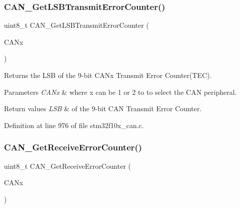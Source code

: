 \subsubsection{\texorpdfstring{C\+A\+N\+\_\+\+Get\+L\+S\+B\+Transmit\+Error\+Counter()}{CAN\_GetLSBTransmitErrorCounter()}}
{\footnotesize\ttfamily uint8\+\_\+t C\+A\+N\+\_\+\+Get\+L\+S\+B\+Transmit\+Error\+Counter (\begin{DoxyParamCaption}\item[{\hyperlink{struct_c_a_n___type_def}{C\+A\+N\+\_\+\+Type\+Def} $\ast$}]{C\+A\+Nx }\end{DoxyParamCaption})}



Returns the L\+SB of the 9-\/bit C\+A\+Nx Transmit Error Counter(\+T\+E\+C). 


\begin{DoxyParams}{Parameters}
{\em C\+A\+Nx} & where x can be 1 or 2 to to select the C\+AN peripheral. \\
\hline
\end{DoxyParams}

\begin{DoxyRetVals}{Return values}
{\em L\+SB} & of the 9-\/bit C\+AN Transmit Error Counter. \\
\hline
\end{DoxyRetVals}


Definition at line 976 of file stm32f10x\+\_\+can.\+c.

\mbox{\label{group___c_a_n___private___functions_ga6903eecbec40eb1361d915ddde9a3274}} 
\subsubsection{\texorpdfstring{C\+A\+N\+\_\+\+Get\+Receive\+Error\+Counter()}{CAN\_GetReceiveErrorCounter()}}
{\footnotesize\ttfamily uint8\+\_\+t C\+A\+N\+\_\+\+Get\+Receive\+Error\+Counter (\begin{DoxyParamCaption}\item[{\hyperlink{struct_c_a_n___type_def}{C\+A\+N\+\_\+\+Type\+Def} $\ast$}]{C\+A\+Nx }\end{DoxyParamCaption})}



